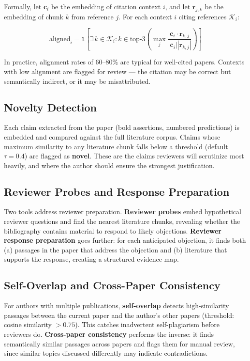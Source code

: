 \documentclass[11pt,a4paper]{article}
\begin{document}
Formally, let $\mathbf{c}_i$ be the embedding of citation context $i$, and let $\mathbf{r}_{j,k}$ be the embedding of chunk $k$ from reference $j$. For each context $i$ citing references $\mathcal{K}_i$:

\begin{equation}
    \text{aligned}_i = \mathbb{1}\left[\exists\, k \in \mathcal{K}_i : k \in \text{top-3}\left(\max_j \frac{\mathbf{c}_i \cdot \mathbf{r}_{k,j}}{|\mathbf{c}_i||\mathbf{r}_{k,j}|}\right)\right]
\end{equation}

In practice, alignment rates of 60--80\% are typical for well-cited papers. Contexts with low alignment are flagged for review --- the citation may be correct but semantically indirect, or it may be misattributed.

\subsection{Novelty Detection}

Each claim extracted from the paper (bold assertions, numbered predictions) is embedded and compared against the full literature corpus. Claims whose maximum similarity to any literature chunk falls below a threshold (default $\tau = 0.4$) are flagged as \textbf{novel}. These are the claims reviewers will scrutinize most heavily, and where the author should ensure the strongest justification.

\subsection{Reviewer Probes and Response Preparation}

Two tools address reviewer preparation. \textbf{Reviewer probes} embed hypothetical reviewer questions and find the nearest literature chunks, revealing whether the bibliography contains material to respond to likely objections. \textbf{Reviewer response preparation} goes further: for each anticipated objection, it finds both (a) passages in the paper that address the objection and (b) literature that supports the response, creating a structured evidence map.

\subsection{Self-Overlap and Cross-Paper Consistency}

For authors with multiple publications, \textbf{self-overlap} detects high-similarity passages between the current paper and the author's other papers (threshold: cosine similarity $> 0.75$). This catches inadvertent self-plagiarism before reviewers do. \textbf{Cross-paper consistency} performs the inverse: it finds semantically similar passages across papers and flags them for manual review, since similar topics discussed differently may indicate contradictions.
\end{document}
